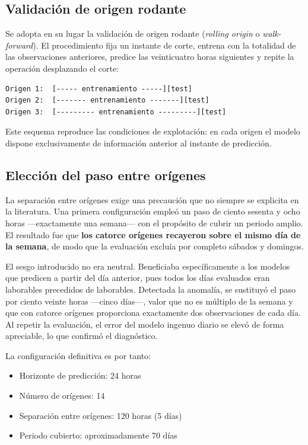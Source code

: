\subsection*{Validación de origen rodante}

Se adopta en su lugar la validación de origen rodante
(\textit{rolling origin} o \textit{walk-forward}). El procedimiento fija un
instante de corte, entrena con la totalidad de las observaciones anteriores,
predice las veinticuatro horas siguientes y repite la operación desplazando el
corte:

\begin{verbatim}
Origen 1:  [----- entrenamiento -----][test]
Origen 2:  [------- entrenamiento -------][test]
Origen 3:  [--------- entrenamiento ---------][test]
\end{verbatim}

Este esquema reproduce las condiciones de explotación: en cada origen el modelo
dispone exclusivamente de información anterior al instante de predicción.

\subsection*{Elección del paso entre orígenes}

La separación entre orígenes exige una precaución que no siempre se explicita en
la literatura. Una primera configuración empleó un paso de ciento sesenta y ocho
horas —exactamente una semana— con el propósito de cubrir un periodo amplio. El
resultado fue que \textbf{los catorce orígenes recayeron sobre el mismo día de la
semana}, de modo que la evaluación excluía por completo sábados y domingos.

El sesgo introducido no era neutral. Beneficiaba específicamente a los modelos que
predicen a partir del día anterior, pues todos los días evaluados eran laborables
precedidos de laborables. Detectada la anomalía, se sustituyó el paso por ciento
veinte horas —cinco días—, valor que no es múltiplo de la semana y que con catorce
orígenes proporciona exactamente dos observaciones de cada día. Al repetir la
evaluación, el error del modelo ingenuo diario se elevó de forma apreciable, lo
que confirmó el diagnóstico.

La configuración definitiva es por tanto:

\begin{itemize}
  \item Horizonte de predicción: 24 horas
  \item Número de orígenes: 14
  \item Separación entre orígenes: 120 horas (5 días)
  \item Periodo cubierto: aproximadamente 70 días
\end{itemize}

